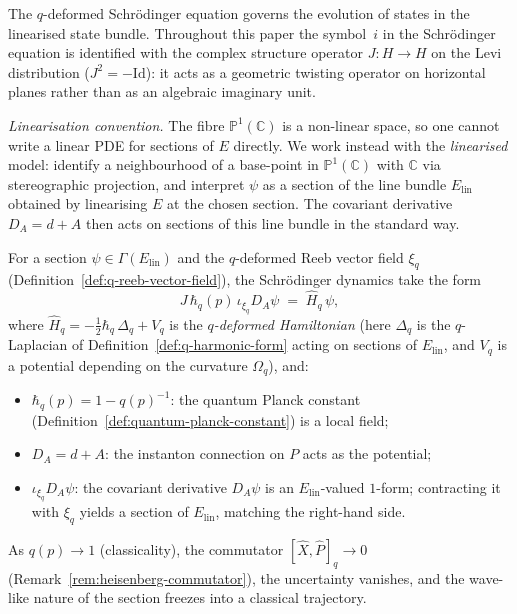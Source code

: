 \begin{remark}
\label{rem:schrodinger-jet-coaction}
The $q$-deformed Schr\"odinger equation governs the evolution of states
in the linearised state bundle.  Throughout this paper the symbol~$i$ in
the Schr\"odinger equation is identified with the complex structure
operator $J \colon H \to H$ on the Levi distribution ($J^2 = -\mathrm{Id}$):
it acts as a geometric twisting operator on horizontal planes rather than
as an algebraic imaginary unit.

\medskip\noindent\textit{Linearisation convention.}\;
The fibre $\mathbb{P}^1(\mathbb{C})$ is a non-linear space, so one cannot write a
linear PDE for sections of $E$ directly.  We work instead with the
\emph{linearised} model: identify a neighbourhood of a base-point in
$\mathbb{P}^1(\mathbb{C})$ with $\mathbb{C}$ via stereographic projection, and
interpret $\psi$ as a section of the line bundle $E_{\mathrm{lin}}$
obtained by linearising $E$ at the chosen section.  The covariant
derivative $D_A = d + A$ then acts on sections of this line bundle in the
standard way.

For a section $\psi \in \Gamma(E_{\mathrm{lin}})$ and the $q$-deformed Reeb
vector field $\xi_q$ (Definition~\ref{def:q-reeb-vector-field}), the
Schr\"odinger dynamics take the form
\[
  J\,\hbar_q(p)\,\iota_{\xi_q} D_A \psi \;=\; \hat{H}_q\, \psi,
\]
where $\hat{H}_q = -\tfrac{1}{2}\hbar_q\,\Delta_q + V_q$ is the
\emph{$q$-deformed Hamiltonian} (here $\Delta_q$ is the $q$-Laplacian of
Definition~\ref{def:q-harmonic-form} acting on sections of
$E_{\mathrm{lin}}$, and $V_q$ is a potential depending on the curvature
$\Omega_q$), and:
\begin{itemize}
  \item $\hbar_q(p) = 1 - q(p)^{-1}$: the quantum Planck constant
        (Definition~\ref{def:quantum-planck-constant}) is a local field;
  \item $D_A = d + A$: the instanton connection on $P$ acts as the potential;
  \item $\iota_{\xi_q} D_A \psi$: the covariant derivative $D_A\psi$ is an
        $E_{\mathrm{lin}}$-valued $1$-form; contracting it with $\xi_q$
        yields a section of $E_{\mathrm{lin}}$, matching the right-hand side.
\end{itemize}
As $q(p) \to 1$ (classicality), the commutator
$[\hat{X}, \hat{P}]_q \to 0$ (Remark~\ref{rem:heisenberg-commutator}), the
uncertainty vanishes, and the wave-like nature of the section freezes into a
classical trajectory.


\end{remark}
